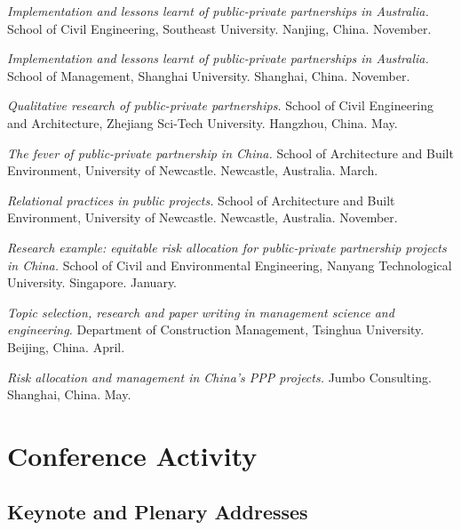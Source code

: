 \documentclass[11pt,a4paper]{report} %
\begin{document}
\begin{tablist}
        \item[2018] \tab{}\textit{Implementation and lessons learnt of public-private partnerships in Australia.} School of Civil Engineering, Southeast University. Nanjing, China. November.
        
        \item[2018] \tab{}\textit{Implementation and lessons learnt of public-private partnerships in Australia.} School of Management, Shanghai University. Shanghai, China. November.
        
        \item[2018] \tab{}\textit{Qualitative research of public-private partnerships.} School of Civil Engineering and Architecture, Zhejiang Sci-Tech University. Hangzhou, China. May.
        
        \item[2015] \tab{}\textit{The fever of public-private partnership in China.} School of Architecture and Built Environment, University of Newcastle. Newcastle, Australia. March.
        
        \item[2013] \tab{}\textit{Relational practices in public projects.} School of Architecture and Built Environment, University of Newcastle. Newcastle, Australia. November.
        
        \item[2013] \tab{}\textit{Research example: equitable risk allocation for public-private partnership projects in China.} School of Civil and Environmental Engineering, Nanyang Technological University. Singapore. January.
        
        \item[2010] \tab{}\textit{Topic selection, research and paper writing in management science and engineering.} Department of Construction Management, Tsinghua University. Beijing, China. April.
        
        \item[2009] \tab{}\textit{Risk allocation and management in China's PPP projects.} Jumbo Consulting. Shanghai, China. May.

    \end{tablist}



    \section*{Conference Activity}

    \subsection*{Keynote and Plenary Addresses}
\end{document}
